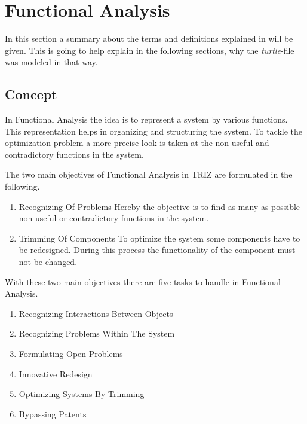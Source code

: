 \section{Functional Analysis}
\label{sec:functional_analysis}

In this section a summary about the terms and definitions explained in \cite{KS} will be given. 
This is going to help explain in the following sections, why the \textit{turtle}-file was modeled in that way.

\subsection{Concept}

In Functional Analysis the idea is to represent a system by various functions.
This representation helps in organizing and structuring the system.
To tackle the optimization problem a more precise look is taken at the non-useful and contradictory functions in the system. 

The two main objectives of Functional Analysis in TRIZ are formulated in the following.

\begin{enumerate}
    \item Recognizing Of Problems \newline
        Hereby the objective is to find as many as possible non-useful or contradictory functions in the system.
    \item Trimming Of Components \newline
        To optimize the system some components have to be redesigned. 
        During this process the functionality of the component must not be changed.  
\end{enumerate}



With these two main objectives there are five tasks to handle in Functional Analysis.

\begin{enumerate}[noitemsep]
	\item Recognizing Interactions Between Objects
	\item Recognizing Problems Within The System
	\item Formulating Open Problems
	\item Innovative Redesign
	\item Optimizing Systems By Trimming
	\item Bypassing Patents
\end{enumerate}


